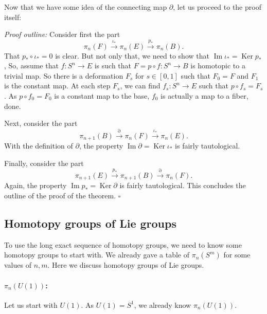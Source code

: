 \documentclass[12pt]{article}
\numberwithin{equation}{section}
\theoremstyle{remark}
\renewenvironment{proof}{\noindent\textsl{Proof outline:}}{\hfill$\square$}
\def\Ker{\mathop{\mathrm{Ker}}}
\def\Im{\mathop{\mathrm{Im}}}
\begin{document}
Now that we have some idea of the connecting map $\partial$,
let us proceed to the proof itself:

\begin{proof}
Consider first the part \begin{equation}
\pi_{n}(F) \stackrel{\iota_*}{\longrightarrow} \pi_{n}(E) \stackrel{p_*}{\longrightarrow} \pi_{n}(B).
\end{equation}
That $p_*\circ \iota_*=0$ is clear.
But not only that, we need to show that $\Im \iota_* = \Ker p_*$,
So, assume that $f:S^n\to E$ is such that $F=p\circ f: S^n\to B$ is homotopic to a trivial map.
So there is a deformation $F_s$ for $s\in [0,1]$ such that $F_0=F$ and $F_1$ is the constant map.
At each step $F_s$, we can find $f_s:S^n \to E$ such that $p\circ f_s=F_s$.
As $p\circ f_0=F_0$ is a constant map to the base, $f_0$ is actually a map to a fiber, done.

Next, consider the part \begin{equation}
  \pi_{n+1}(B)\stackrel{\partial}{\longrightarrow}\pi_{n}(F) \stackrel{\iota_*}{\longrightarrow} \pi_{n}(E).
\end{equation}
With the definition of $\partial$, the property $\Im \partial = \Ker \iota_*$ is fairly tautological.

Finally, consider the part \begin{equation}
  \pi_{n+1}(E) \stackrel{p_*}{\longrightarrow} \pi_{n+1}(B) \stackrel{\partial}{\longrightarrow} \pi_{n}(F).
\end{equation}
Again, the property $\Im p_* = \Ker \partial$ is fairly tautological.
This concludes the outline of the proof of the theorem.
\end{proof}



\subsection{Homotopy groups of Lie groups}

To use the long exact sequence of homotopy groups,
we need to know some homotopy groups to start with.
We already gave a table of $\pi_n(S^m)$ for some values of $n,m$.
Here we discuss homotopy groups of Lie groups.

\paragraph{$\pi_n(U(1))$:}
Let us start with $U(1)$. As $U(1)=S^1$, we already know $\pi_n(U(1))$.
\end{document}
